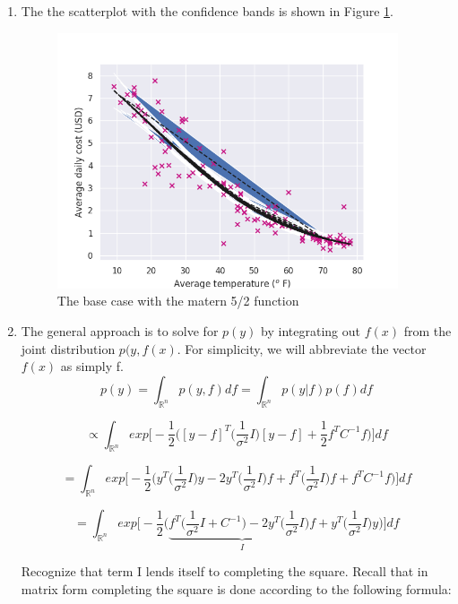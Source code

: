 \documentclass[10pt]{article}
\begin{document}
\begin{enumerate}[label=(\Alph*)]
    \item
    The the scatterplot with the confidence bands is shown in Figure \ref{fig:confidence_band}.
    
    \begin{figure}[htb] \centering
    \includegraphics[width=0.95\textwidth]{./confidence_band.png}
    \caption{The base case with the matern 5/2 function}
    \label{fig:confidence_band}
    \end{figure}
    
    \item
    The general approach is to solve for $p(y)$ by integrating out $f(x)$ from the joint distribution $p(y,f(x)$. For simplicity, we will abbreviate the vector $f(x)$ as simply f. $$p(y) = \int_{\mathbb{R}^n}p(y,f)df = \int_{\mathbb{R}^n}p(y|f)p(f)df $$
    
    $$\propto
    \int_{\mathbb{R}^n}
    exp\Bigg[-\frac{1}{2}\bigg([y-f]^T\big(\frac{1}{\sigma^2}I\big)[y-f] + \frac{1}{2}f^TC^{-1}f\bigg)\Bigg]df$$
    
    $$= 
    \int_{\mathbb{R}^n}
    exp\Bigg[-\frac{1}{2}\bigg(
    y^T \big(\frac{1}{\sigma^2}I\big) y - 
    2y^T \big(\frac{1}{\sigma^2}I\big) f +
    f^T \big(\frac{1}{\sigma^2}I\big) f +
    f^T C^{-1} f
    \bigg)\Bigg]df$$
    
    $$=
    \int_{\mathbb{R}^n}
    exp\Bigg[-\frac{1}{2}\bigg(
    \underbrace{f^T \big(\frac{1}{\sigma^2}I + C^{-1}\big)
    - 2y^T \big(\frac{1}{\sigma^2}I\big) f}_{I} +
    y^T \big(\frac{1}{\sigma^2}I\big) y
    \bigg)\Bigg]df$$
    
    Recognize that term I lends itself to completing the square. Recall that in matrix form completing the square is done according to the following formula:
    

\end{enumerate}
\end{document}
